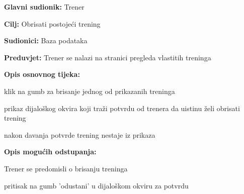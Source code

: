 					
					\noindent {}
					\begin{packed_item}
	
						\item \textbf{Glavni sudionik: }Trener
						\item  \textbf{Cilj: } Obrisati postojeći trening
						\item  \textbf{Sudionici: } Baza podataka
						\item  \textbf{Preduvjet: } Trener se nalazi na stranici pregleda vlastitih treninga
						\item  \textbf{Opis osnovnog tijeka:}
						
						\item[] \begin{packed_enum}
	
							\item klik na gumb za brisanje jednog od prikazanih treninga
							\item prikaz dijaloškog okvira koji traži potvrdu od trenera da uistinu želi obrisati trening
							\item nakon davanja potvrde trening nestaje iz prikaza
							
						\end{packed_enum}
						
						\item  \textbf{Opis mogućih odstupanja:}
						
						\item[] \begin{packed_item}
	
							\item Trener se predomisli o brisanju treninga
							\item[] \begin{packed_enum}
								
								\item pritisak na gumb 'odustani' u dijaloškom okviru za potvrdu
								
							\end{packed_enum}
							
						\end{packed_item}
					\end{packed_item}
					
